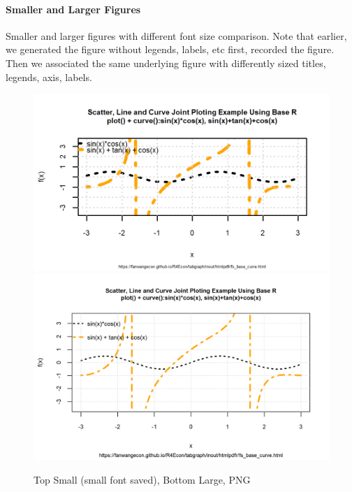 \documentclass[
]{book}
\begin{document}
\hypertarget{smaller-and-larger-figures}{%
\paragraph{Smaller and Larger Figures}\label{smaller-and-larger-figures}}

Smaller and larger figures with different font size comparison. Note that earlier, we generated the figure without legends, labels, etc first, recorded the figure. Then we associated the same underlying figure with differently sized titles, legends, axis, labels.

\begin{figure}
\centering
\caption{Top Small (small font saved), Bottom Large, PNG}
\includegraphics[width=\linewidth]{_img/fs_img_io_2curve_w80h48_res300.png}
\hfill
\centering
\includegraphics[width=\linewidth]{_img/fs_img_io_2curve_w160h100_res300.png}
\end{figure}

\hypertarget{appendix-appendix}{%
\appendix}
\end{document}
